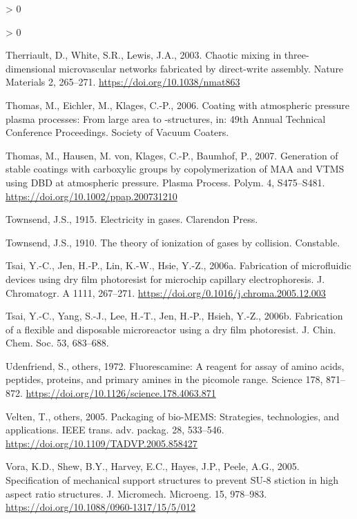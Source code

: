 \documentclass[
  11pt,
  twoside]{article}
\newlength{\cslhangindent}
\newenvironment{CSLReferences}[2] %
 {%
  \setlength{\parindent}{0pt}
  \ifodd #1 \everypar{\setlength{\hangindent}{\cslhangindent}}\ignorespaces\fi
  \ifnum #2 > 0
  \setlength{\parskip}{#2\baselineskip}
  \fi
 }%
 {}
\begin{document}
\begin{CSLReferences}{1}{0}
\begin{CSLReferences}{1}{0}
\leavevmode\hypertarget{ref-Ther03}{}%
Therriault, D., White, S.R., Lewis, J.A., 2003. Chaotic mixing in three-dimensional microvascular networks fabricated by direct-write assembly. Nature Materials 2, 265--271. \url{https://doi.org/10.1038/nmat863}

\leavevmode\hypertarget{ref-Thom06}{}%
Thomas, M., Eichler, M., Klages, C.-P., 2006. Coating with atmospheric pressure plasma processes: From large area to {}-structures, in: 49th Annual Technical Conference Proceedings. Society of Vacuum Coaters.

\leavevmode\hypertarget{ref-Thom07}{}%
Thomas, M., Hausen, M. von, Klages, C.-P., Baumhof, P., 2007. Generation of stable coatings with carboxylic groups by copolymerization of {MAA} and {VTMS} using {DBD} at atmospheric pressure. Plasma Process. Polym. 4, S475--S481. \url{https://doi.org/10.1002/ppap.200731210}

\leavevmode\hypertarget{ref-Town1915}{}%
Townsend, J.S., 1915. Electricity in gases. Clarendon Press.

\leavevmode\hypertarget{ref-Town1910}{}%
Townsend, J.S., 1910. The theory of ionization of gases by collision. Constable.

\leavevmode\hypertarget{ref-Tsai06-2}{}%
Tsai, Y.-C., Jen, H.-P., Lin, K.-W., Hsie, Y.-Z., 2006a. Fabrication of microfluidic devices using dry film photoresist for microchip capillary electrophoresis. J. Chromatogr. A 1111, 267--271. \url{https://doi.org/0.1016/j.chroma.2005.12.003}

\leavevmode\hypertarget{ref-Tsai06-1}{}%
Tsai, Y.-C., Yang, S.-J., Lee, H.-T., Jen, H.-P., Hsieh, Y.-Z., 2006b. Fabrication of a flexible and disposable microreactor using a dry film photoresist. J. Chin. Chem. Soc. 53, 683--688.

\leavevmode\hypertarget{ref-Uden1972}{}%
Udenfriend, S., others, 1972. Fluorescamine: A reagent for assay of amino acids, peptides, proteins, and primary amines in the picomole range. Science 178, 871--872. \url{https://doi.org/10.1126/science.178.4063.871}

\leavevmode\hypertarget{ref-Velt05}{}%
Velten, T., others, 2005. Packaging of bio-MEMS: Strategies, technologies, and applications. IEEE trans. adv. packag. 28, 533--546. \url{https://doi.org/10.1109/TADVP.2005.858427}

\leavevmode\hypertarget{ref-Vora05}{}%
Vora, K.D., Shew, B.Y., Harvey, E.C., Hayes, J.P., Peele, A.G., 2005. {Specification of mechanical support structures to prevent SU-8 stiction in high aspect ratio structures}. J. Micromech. Microeng. 15, 978--983. \url{https://doi.org/10.1088/0960-1317/15/5/012}


\end{CSLReferences}
\end{CSLReferences}
\end{document}

